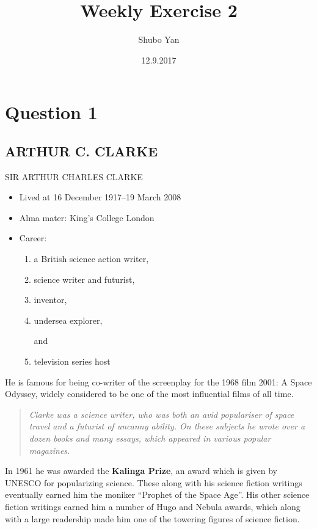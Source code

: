 \documentclass[a4paper,12pt]{article}
\title{ Weekly Exercise 2}
\author{Shubo Yan }
\date{12.9.2017}
\begin{document}
	\maketitle
\newpage
\section{Question 1}
\subsection*{A{\small RTHUR} C. C{\small LARKE}}

{\LARGE S{\Large IR} A{\Large RTHUR} C{\Large HARLES} C{\Large LARKE}\par}

\begin{itemize}	
\item Lived at 16 December 1917--19 March 2008
\item Alma mater: King's College London
\item Career:
\begin{enumerate}
\item a British science  action writer,
\item science writer and futurist,
\item inventor,
\item undersea explorer,
\begin{flushleft}
and
\end{flushleft}
\item television series host	
\end{enumerate}	
\end{itemize}	

He is famous for being co-writer of the screenplay for the 1968 film 2001: A Space Odyssey, widely considered to be one of the most influential films of all time.
\begin{quote}
\textit{Clarke was a science writer, who was both an avid populariser of space travel and a futurist of uncanny ability. On these subjects he wrote over a dozen books and many essays, which appeared in various popular magazines.}
\end{quote}
In 1961 he was awarded the \textbf{Kalinga Prize}, an award which is given by UNESCO for popularizing science. These along with his science fiction writings eventually earned him the moniker ``Prophet of the Space Age''. His other science fiction writings earned him a number of Hugo and Nebula awards, which along with a large readership made him one of the towering figures of science fiction.
\end{document}
